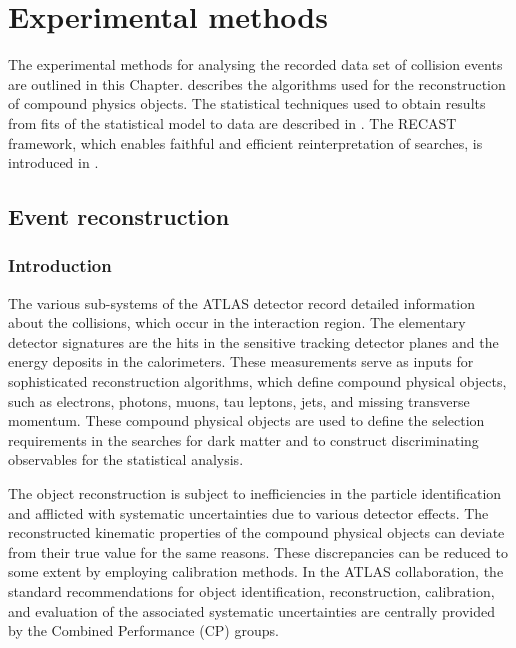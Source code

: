 %
\chapter{Experimental methods}
\label{ch:methods}


The experimental methods for analysing the recorded data set of \HepProcess{\Pp\Pp} collision events are outlined in this Chapter.  describes the algorithms used for the reconstruction of compound physics objects. The statistical techniques used to obtain results from fits of the statistical model to data are described in . The RECAST framework, which enables faithful and efficient reinterpretation of searches, is introduced in .

\section{Event reconstruction}
\label{sec:methods:event-reconstruction}
\subsection{Introduction}
\label{sec:methods:event-reconstruction:intro}
The various sub-systems of the ATLAS detector record detailed information about the \HepProcess{\Pp\Pp} collisions, which occur in the interaction region. The elementary detector signatures are the hits in the sensitive tracking detector planes and the energy deposits in the calorimeters. These measurements serve as inputs for sophisticated reconstruction algorithms, which define compound physical objects, such as electrons, photons, muons, tau leptons, jets, and missing transverse momentum. These compound physical objects are used to define the selection requirements in the searches for dark matter and to construct discriminating observables for the statistical analysis.

The object reconstruction is subject to inefficiencies in the particle identification and afflicted with systematic uncertainties due to various detector effects. The reconstructed kinematic properties of the compound physical objects can deviate from their true value for the same reasons. These discrepancies can be reduced to some extent by employing calibration methods. In the ATLAS collaboration, the standard recommendations for object identification, reconstruction, calibration, and evaluation of the associated systematic uncertainties are centrally provided by the Combined Performance (CP) groups.


